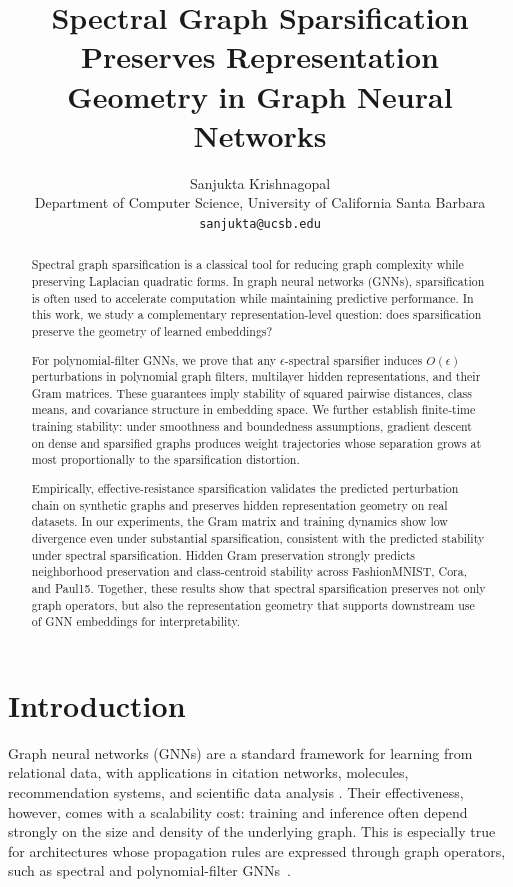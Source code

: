 \documentclass{article}
\title{Spectral Graph Sparsification Preserves Representation Geometry in Graph Neural Networks}
\author{%
  Sanjukta Krishnagopal \\
  Department of Computer Science, University of California Santa Barbara \\
  \texttt{sanjukta@ucsb.edu}
}
\begin{document}
\maketitle

\begin{abstract}
Spectral graph sparsification is a classical tool for reducing graph complexity while preserving Laplacian quadratic forms. In graph neural networks (GNNs), sparsification is often used to accelerate computation while maintaining predictive performance. In this work, we study a complementary representation-level question: does sparsification preserve the geometry of learned embeddings?

For polynomial-filter GNNs, we prove that any $\epsilon$-spectral sparsifier induces $O(\epsilon)$ perturbations in polynomial graph filters, multilayer hidden representations, and their Gram matrices. These guarantees imply stability of squared pairwise distances, class means, and covariance structure in embedding space. We further establish finite-time training stability: under smoothness and boundedness assumptions, gradient descent on dense and sparsified graphs produces weight trajectories whose separation grows at most proportionally to the sparsification distortion.


Empirically, effective-resistance sparsification validates the predicted perturbation chain on synthetic graphs and preserves hidden representation geometry on real datasets. In our experiments, the Gram matrix and training dynamics show low divergence even under substantial sparsification, consistent with the predicted stability under spectral sparsification. Hidden Gram preservation strongly predicts neighborhood preservation and class-centroid stability across FashionMNIST, Cora, and Paul15. Together, these results show that spectral sparsification preserves not only graph operators, but also the representation geometry that supports downstream use of GNN embeddings for interpretability.
\end{abstract}



\section{Introduction}
Graph neural networks (GNNs) are a standard framework for learning from relational data, with applications in citation networks, molecules, recommendation systems, and scientific data analysis
\citep{kipf2017gcn,hamilton2017graphsage,defferrard2016cnn}. Their effectiveness, however, comes with a scalability cost: training and inference often depend strongly on the size and density of the underlying graph. This is especially true for architectures whose propagation rules are expressed through graph operators, such as spectral and polynomial-filter GNNs~\cite{bruna2014spectral,defferrard2016cnn}.
\end{document}

